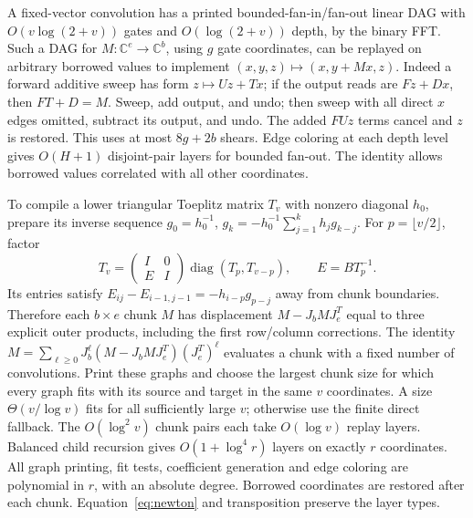 \documentclass[11pt]{amsart}
\theoremstyle{remark}
\newcommand{\C}{\mathbb C}
\newcommand{\diag}{\operatorname{diag}}
\begin{document}
A fixed-vector convolution has a printed bounded-fan-in/fan-out linear
DAG with $O(v\log(2+v))$ gates and $O(\log(2+v))$ depth, by the binary
FFT. Such a DAG for $M:\C^e\to\C^b$, using $g$ gate coordinates, can
be replayed on arbitrary borrowed values to implement
$(x,y,z)\mapsto(x,y+Mx,z)$. Indeed a forward additive sweep has form
$z\mapsto Uz+Tx$; if the output reads are $Fz+Dx$, then $FT+D=M$.
Sweep, add output, and undo; then sweep with all direct $x$ edges
omitted, subtract its output, and undo. The added $FUz$ terms cancel
and $z$ is restored. This uses at most $8g+2b$ shears. Edge coloring
at each depth level gives $O(H+1)$ disjoint-pair layers for bounded
fan-out. The identity allows borrowed values correlated with all
other coordinates.

To compile a lower triangular Toeplitz matrix $T_v$ with nonzero
diagonal $h_0$, prepare its inverse sequence
$g_0=h_0^{-1}$, $g_k=-h_0^{-1}\sum_{j=1}^kh_jg_{k-j}$.
For $p=\lfloor v/2\rfloor$, factor
\[
 T_v=\begin{pmatrix}I&0\\E&I\end{pmatrix}
             \diag(T_p,T_{v-p}),\qquad E=BT_p^{-1}.
\]
Its entries satisfy $E_{ij}-E_{i-1,j-1}=-h_{i-p}g_{p-j}$ away from
chunk boundaries. Therefore each $b\times e$ chunk $M$ has displacement
$M-J_bMJ_e^T$ equal to three explicit outer products, including the
first row/column corrections. The identity
$M=\sum_{\ell\ge0}J_b^\ell(M-J_bMJ_e^T)(J_e^T)^\ell$ evaluates a
chunk with a fixed number of convolutions. Print these graphs and
choose the largest chunk size for which every graph fits with its
source and target in the same $v$ coordinates. A size
$\Theta(v/\log v)$ fits for all sufficiently large $v$; otherwise
use the finite direct fallback. The $O(\log^2v)$ chunk pairs each
take $O(\log v)$ replay layers. Balanced child recursion gives
$O(1+\log^4r)$ layers on exactly $r$ coordinates. All graph printing,
fit tests, coefficient generation and edge coloring are polynomial
in $r$, with an absolute degree. Borrowed coordinates are restored
after each chunk. Equation~\eqref{eq:newton} and transposition preserve
the layer types.
\end{document}
